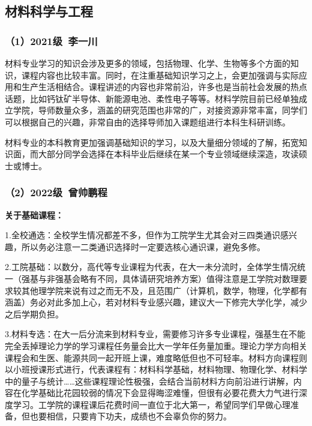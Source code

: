 \documentclass[11pt,oneside]{book}
\begin{document}
\subsection{材料科学与工程}
\subsubsection{（1）2021级\ 李一川}
材料专业学习的知识会涉及更多的领域，包括物理、化学、生物等多个方面的知识，课程内容也比较丰富。同时，在注重基础知识学习之上，会更加强调与实际应用和生产生活相结合。课程讲述的内容也非常前沿，许多也是当前社会发展的热点话题，比如钙钛矿半导体、新能源电池、柔性电子等等。材料学院目前已经单独成立学院，导师数量众多，涵盖的研究范围也非常的广，对接资源非常丰富，同学们可以根据自己的兴趣，非常自由的选择导师加入课题组进行本科生科研训练。

\vspace{10pt}

材料专业的本科教育更加强调基础知识的学习，以及大量细分领域的了解，拓宽知识面，而大部分同学会选择在本科毕业后继续在某一个专业领域继续深造，攻读硕士或博士。
\subsubsection{（2）2022级\ 曾帅鹏程}
\textbf{关于基础课程：}

1.全校通选：全校学生情况都差不多，但作为工院学生尤其会对三四类通识感兴趣，所以务必注意一二类通识选择时一定要选核心通识课，避免多修。

\vspace{10pt}

2.工院基础：以数分，高代等专业课程为代表，在大一未分流时，全体学生情况统一（强基与非强基会略有不同，具体请研究培养方案）值得注意是工学院对数理要求较其他理学院来说有过之而无不及，且范围广（计算机，数学，物理，化学都有涵盖）务必对此多加上心，若对材料专业感兴趣，建议大一下修完大学化学，减少之后学期负担。

\vspace{10pt}

3.材料专选：在大一后分流来到材料专业，需要修习许多专业课程，强基生在不能完全丢掉理论力学的学习课程任务量会比大一学年任务量加重。理论力学方向相关课程会和生医、能源共同一起开班上课，难度略低但也不可轻率。材料方向课程则以小班授课形式进行，代表课程有：材料科学基础，材料物理、物理化学、材料学中的量子与统计……这些课程理论性极强，会结合当前材料方向前沿进行讲解，内容在化学基础比花园较弱的情况下会显得晦涩难懂，但很有必要花费大力气进行深度学习。工学院的课程课后花费时间一直位于北大第一，希望同学们早做心理准备，但也要相信，只要肯下功夫，成绩也不会辜负你的努力。
\end{document}
